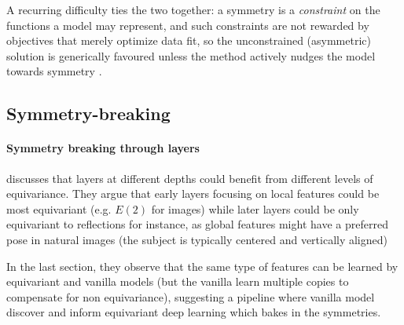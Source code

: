 \myline

A recurring difficulty ties the two together: a symmetry is a \emph{constraint} on the functions a model may represent, and such constraints are not rewarded by objectives that merely optimize data fit, so the unconstrained (asymmetric) solution is generically favoured unless the method actively nudges the model towards symmetry \citep{ouderaa2022,benton2020anips,ouderaa2024}.

\myline

\subsection{Symmetry-breaking}




\paragraph{Symmetry breaking through layers}

\cite{weiler2019anips} discusses that layers at different depths could benefit from different levels of equivariance.
They argue that early layers focusing on local features could be most equivariant (e.g. $E(2)$ for images) while later layers could be only equivariant to reflections for instance, as global features might have a preferred pose in natural images (the subject is typically centered and vertically aligned)

\myline

\cite{olah2020d} In the last section, they observe that the same type of features can be learned by equivariant and vanilla models (but the vanilla learn multiple copies to compensate for non equivariance), suggesting a pipeline where vanilla model discover and inform equivariant deep learning which bakes in the symmetries.

